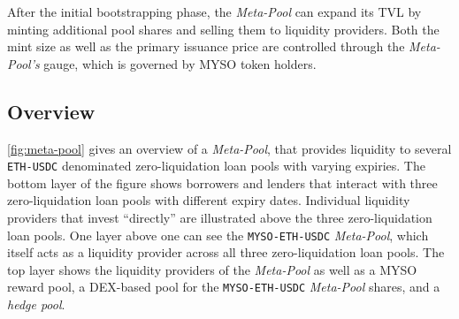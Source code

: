 \documentclass[a4paper]{article}
\begin{document}
After the initial bootstrapping phase, the \emph{Meta-Pool} can expand its TVL by minting additional pool shares and selling them to liquidity providers. Both the mint size as well as the primary issuance price are controlled through the \emph{Meta-Pool's} gauge, which is governed by MYSO token holders.\\

\subsection{Overview}
\cref{fig:meta-pool} gives an overview of a \emph{Meta-Pool}, that provides liquidity to several \verb|ETH-USDC| denominated zero-liquidation loan pools with varying expiries. The bottom layer of the figure shows borrowers and lenders that interact with three zero-liquidation loan pools with different expiry dates. Individual liquidity providers that invest ``directly'' are illustrated above the three zero-liquidation loan pools. One layer above one can see the \verb|MYSO-ETH-USDC| \emph{Meta-Pool}, which itself acts as a liquidity provider across all three zero-liquidation loan pools. The top layer shows the liquidity providers of the \emph{Meta-Pool} as well as a MYSO reward pool, a DEX-based pool for the \verb|MYSO-ETH-USDC| \emph{Meta-Pool} shares, and a \emph{hedge pool}.

\end{document}
